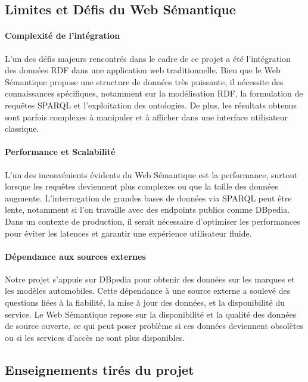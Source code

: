 \documentclass[a4paper]{article}
\begin{document}
\subsection{Limites et Défis du Web Sémantique}

\paragraph{Complexité de l'intégration} L'un des défis majeurs rencontrés dans le cadre de ce projet a été l'intégration des données RDF dans une application web traditionnelle. Bien que le Web Sémantique propose une structure de données très puissante, il nécessite des connaissances spécifiques, notamment sur la modélisation RDF, la formulation de requêtes SPARQL et l'exploitation des ontologies. De plus, les résultats obtenus sont parfois complexes à manipuler et à afficher dans une interface utilisateur classique.

\paragraph{Performance et Scalabilité} L'un des inconvénients évidents du Web Sémantique est la performance, surtout lorsque les requêtes deviennent plus complexes ou que la taille des données augmente. L'interrogation de grandes bases de données via SPARQL peut être lente, notamment si l'on travaille avec des endpoints publics comme DBpedia. Dans un contexte de production, il serait nécessaire d'optimiser les performances pour éviter les latences et garantir une expérience utilisateur fluide.

\paragraph{Dépendance aux sources externes} Notre projet s'appuie sur DBpedia pour obtenir des données sur les marques et les modèles automobiles. Cette dépendance à une source externe a soulevé des questions liées à la fiabilité, la mise à jour des données, et la disponibilité du service. Le Web Sémantique repose sur la disponibilité et la qualité des données de source ouverte, ce qui peut poser problème si ces données deviennent obsolètes ou si les services d'accès ne sont plus disponibles.

\subsection{Enseignements tirés du projet}
\end{document}
